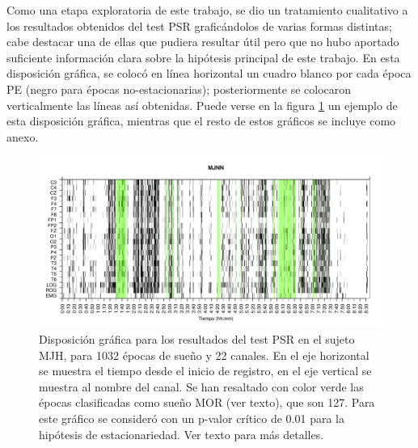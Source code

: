 Como una etapa exploratoria de este trabajo, se dio un
tratamiento cualitativo a los resultados obtenidos del test PSR
grafic\'andolos de varias formas distintas; cabe destacar una de ellas que pudiera resultar
\'util pero que no hubo aportado suficiente informaci\'on clara sobre la hip\'otesis
principal de este trabajo.
En esta disposici\'on gr\'afica,
se coloc\'o en l\'inea horizontal un cuadro blanco por cada
\'epoca PE (negro para \'epocas no-estacionarias);
posteriormente se colocaron verticalmente las
l\'ineas as\'i obtenidas.
Puede verse en la figura \ref{ejemplo1} un ejemplo de esta disposici\'on gr\'afica, mientras
que el resto de estos gr\'aficos se incluye como anexo.

\begin{figure}
\includegraphics[width=\textwidth]{MJNNVIGILOS_127_mor127_tot1032_esttotal.pdf} 
\caption{Disposici\'on gr\'afica para los resultados del test PSR en el sujeto MJH, 
para 1032 \'epocas de sue\~no y 22 canales. 
En el eje horizontal se muestra el tiempo desde el inicio de registro, en el eje vertical se muestra al 
nombre del canal. 
Se han resaltado con color verde las \'epocas clasificadas como sue\~no MOR (ver texto), que son 127.
Para este gr\'afico se consider\'o con un p-valor cr\'itico de 0.01 para la hip\'otesis
de estacionariedad. Ver texto para m\'as detalles.}
\label{ejemplo1}
\end{figure}

